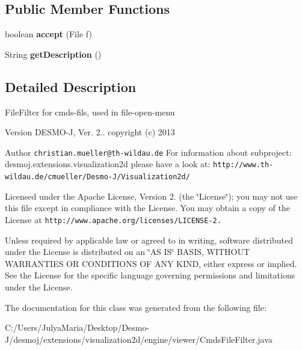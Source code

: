 \subsection*{Public Member Functions}
\begin{DoxyCompactItemize}
\item 
boolean {\bfseries accept} (File f)\label{classdesmoj_1_1extensions_1_1visualization2d_1_1engine_1_1viewer_1_1_cmds_file_filter_a29501991c33919308f347ca7538684fb}

\item 
String {\bfseries get\-Description} ()\label{classdesmoj_1_1extensions_1_1visualization2d_1_1engine_1_1viewer_1_1_cmds_file_filter_a2f1833dd81afaba558c24bca3de03e6c}

\end{DoxyCompactItemize}


\subsection{Detailed Description}
File\-Filter for cmds-\/fils, used in file-\/open-\/menu

\begin{DoxyVersion}{Version}
D\-E\-S\-M\-O-\/\-J, Ver. 2.. copyright (c) 2013 
\end{DoxyVersion}
\begin{DoxyAuthor}{Author}
{\tt christian.\-mueller@th-\/wildau.\-de} For information about subproject\-: desmoj.\-extensions.\-visualization2d please have a look at\-: {\tt http\-://www.\-th-\/wildau.\-de/cmueller/\-Desmo-\/\-J/\-Visualization2d/}
\end{DoxyAuthor}
Licensed under the Apache License, Version 2. (the \char`\"{}\-License\char`\"{}); you may not use this file except in compliance with the License. You may obtain a copy of the License at {\tt http\-://www.\-apache.\-org/licenses/\-L\-I\-C\-E\-N\-S\-E-\/2.}

Unless required by applicable law or agreed to in writing, software distributed under the License is distributed on an \char`\"{}\-A\-S I\-S\char`\"{} B\-A\-S\-I\-S, W\-I\-T\-H\-O\-U\-T W\-A\-R\-R\-A\-N\-T\-I\-E\-S O\-R C\-O\-N\-D\-I\-T\-I\-O\-N\-S O\-F A\-N\-Y K\-I\-N\-D, either express or implied. See the License for the specific language governing permissions and limitations under the License. 

The documentation for this class was generated from the following file\-:\begin{DoxyCompactItemize}
\item 
C\-:/\-Users/\-Julya\-Maria/\-Desktop/\-Desmo-\/\-J/desmoj/extensions/visualization2d/engine/viewer/Cmds\-File\-Filter.\-java\end{DoxyCompactItemize}
